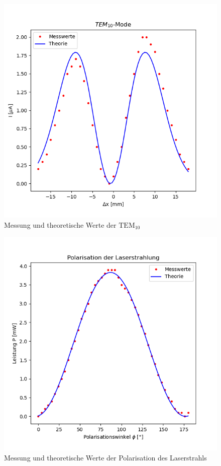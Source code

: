 \begin{figure}
\includegraphics{figures/TEM_10.png}
\caption{Messung und theoretische Werte der $\text{TEM}_{10}$}
\label{fig:TEM_10}
\end{figure}




\begin{figure}
\includegraphics{figures/Polarisation.png}
\caption{Messung und theoretische Werte der Polarisation des Laserstrahls}
\label{fig:Polarisation}
\end{figure}






